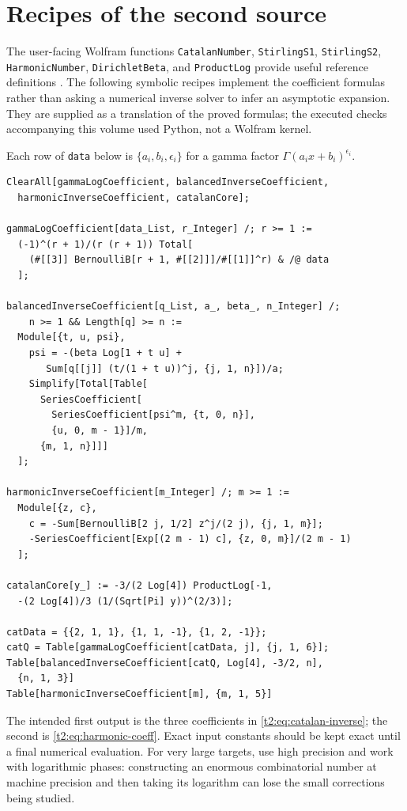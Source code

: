 \documentclass[11pt,openany]{book}
\numberwithin{equation}{chapter}
\theoremstyle{plain}
\theoremstyle{definition}
\theoremstyle{remark}
\begin{document}
\section{Recipes of the second source}
\label{ct:app:wolfram-t2}

\label{t2:app:wolfram}

The user-facing Wolfram functions \texttt{CatalanNumber}, \texttt{StirlingS1}, \texttt{StirlingS2}, \texttt{HarmonicNumber}, \texttt{DirichletBeta}, and \texttt{ProductLog} provide useful reference definitions \cite{wlcatalan,wlstirling1,wlstirling2,wlharmonic,wlbeta,wlproductlog}. The following symbolic recipes implement the coefficient formulas rather than asking a numerical inverse solver to infer an asymptotic expansion. They are supplied as a translation of the proved formulas; the executed checks accompanying this volume used Python, not a Wolfram kernel.

Each row of \texttt{data} below is $\{a_i,b_i,\epsilon_i\}$ for a gamma factor $\Gamma(a_ix+b_i)^{\epsilon_i}$.
\begin{lstlisting}
ClearAll[gammaLogCoefficient, balancedInverseCoefficient,
  harmonicInverseCoefficient, catalanCore];

gammaLogCoefficient[data_List, r_Integer] /; r >= 1 :=
  (-1)^(r + 1)/(r (r + 1)) Total[
    (#[[3]] BernoulliB[r + 1, #[[2]]]/#[[1]]^r) & /@ data
  ];

balancedInverseCoefficient[q_List, a_, beta_, n_Integer] /;
    n >= 1 && Length[q] >= n :=
  Module[{t, u, psi},
    psi = -(beta Log[1 + t u] +
       Sum[q[[j]] (t/(1 + t u))^j, {j, 1, n}])/a;
    Simplify[Total[Table[
      SeriesCoefficient[
        SeriesCoefficient[psi^m, {t, 0, n}],
        {u, 0, m - 1}]/m,
      {m, 1, n}]]]
  ];

harmonicInverseCoefficient[m_Integer] /; m >= 1 :=
  Module[{z, c},
    c = -Sum[BernoulliB[2 j, 1/2] z^j/(2 j), {j, 1, m}];
    -SeriesCoefficient[Exp[(2 m - 1) c], {z, 0, m}]/(2 m - 1)
  ];

catalanCore[y_] := -3/(2 Log[4]) ProductLog[-1,
  -(2 Log[4])/3 (1/(Sqrt[Pi] y))^(2/3)];

catData = {{2, 1, 1}, {1, 1, -1}, {1, 2, -1}};
catQ = Table[gammaLogCoefficient[catData, j], {j, 1, 6}];
Table[balancedInverseCoefficient[catQ, Log[4], -3/2, n],
  {n, 1, 3}]
Table[harmonicInverseCoefficient[m], {m, 1, 5}]
\end{lstlisting}

The intended first output is the three coefficients in \eqref{t2:eq:catalan-inverse}; the second is \eqref{t2:eq:harmonic-coeff}. Exact input constants should be kept exact until a final numerical evaluation. For very large targets, use high precision and work with logarithmic phases: constructing an enormous combinatorial number at machine precision and then taking its logarithm can lose the small corrections being studied.
\end{document}
